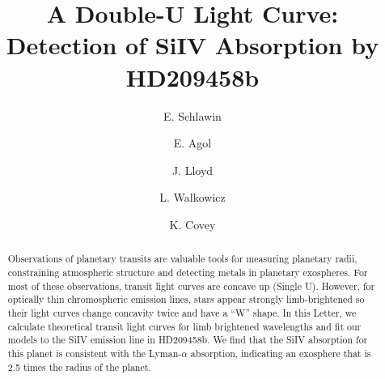 \documentclass[manuscript]{aastex}
\begin{document}

\title{A Double-U Light Curve:\\
Detection of SiIV Absorption by HD209458b}


\author{E. Schlawin} 
\author{E. Agol}
\author{J. Lloyd}
\author{L. Walkowicz}
\author{K. Covey}







\begin{abstract}
Observations of planetary transits are valuable tools for measuring planetary radii, constraining atmospheric structure and detecting metals in planetary exospheres. For most of these observations, transit light curves are concave up (Single U). However, for optically thin chromospheric emission lines, stars appear strongly limb-brightened so their light curves change concavity twice and have a ``W'' shape. In this Letter, we calculate theoretical transit light curves for limb brightened wavelengths and fit our models to the SiIV emission line in HD209458b. We find that the SiIV absorption for this planet is consistent with the Lyman-$\alpha$ absorption, indicating an exosphere that is 2.5 times the radius of the planet.
\end{abstract}
\end{document}
